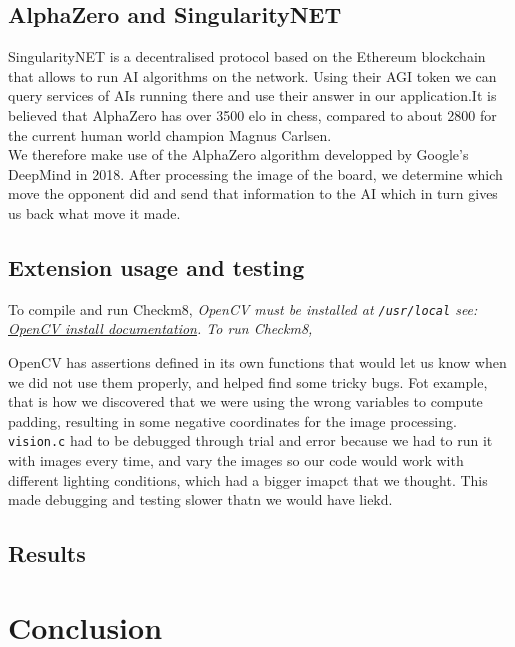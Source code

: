 \documentclass[11pt]{article}
\begin{document}
\subsection{AlphaZero and SingularityNET}

SingularityNET is a decentralised protocol based on the Ethereum blockchain that
allows to run AI algorithms on the network. Using their AGI token we can query
services of AIs running there and use their answer in our application.It is
believed that AlphaZero has over 3500 elo in chess, compared to about 2800 for
the current human world champion Magnus Carlsen.\\ We therefore make use of the
AlphaZero algorithm developped by Google's DeepMind in 2018. After processing
the image of the board, we determine which move the opponent did and send that
information to the AI which in turn gives us back what move it made.

\subsection{Extension usage and testing}
To compile and run Checkm8, \em OpenCV \em must be installed at
\texttt{/usr/local} see:
\href{https://docs.opencv.org/3.4.6/d7/d9f/tutorial_linux_install.html}{OpenCV install documentation}.
To run Checkm8, %


OpenCV has assertions defined in its own functions that would let us 
know when we did not use them properly, and helped find some tricky bugs.
Fot example, that is how we discovered that we were using the wrong variables
to compute padding, resulting in some negative coordinates for the image
processing.
\texttt{vision.c} had to be debugged through trial and error because we
had to run it with images every time, and vary the images so our code would
work with different lighting conditions, which had a bigger imapct that we 
thought. This made debugging and testing slower thatn we would have liekd.
\subsection{Results}
\section{Conclusion}
\end{document}
